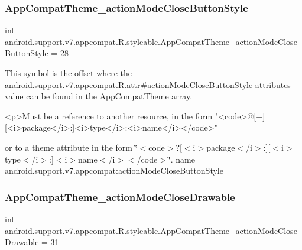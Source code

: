 \subsubsection{\texorpdfstring{App\+Compat\+Theme\+\_\+action\+Mode\+Close\+Button\+Style}{AppCompatTheme\_actionModeCloseButtonStyle}}
{\footnotesize\ttfamily int android.\+support.\+v7.\+appcompat.\+R.\+styleable.\+App\+Compat\+Theme\+\_\+action\+Mode\+Close\+Button\+Style = 28\hspace{0.3cm}{\ttfamily [static]}}

This symbol is the offset where the \hyperlink{classandroid_1_1support_1_1v7_1_1appcompat_1_1R_1_1attr_a67dbe021038d6f18acd2b888552074ac}{android.\+support.\+v7.\+appcompat.\+R.\+attr\#action\+Mode\+Close\+Button\+Style} attribute\textquotesingle{}s value can be found in the \hyperlink{classandroid_1_1support_1_1v7_1_1appcompat_1_1R_1_1styleable_a5c42f89e8a410c323be34208d75c430b}{App\+Compat\+Theme} array.

\begin{DoxyVerb}      <p>Must be a reference to another resource, in the form "<code>@[+][<i>package</i>:]<i>type</i>:<i>name</i></code>"
\end{DoxyVerb}
 or to a theme attribute in the form \char`\"{}$<$code$>$?\mbox{[}$<$i$>$package$<$/i$>$\+:\mbox{]}\mbox{[}$<$i$>$type$<$/i$>$\+:\mbox{]}$<$i$>$name$<$/i$>$$<$/code$>$\char`\"{}.  name android.\+support.\+v7.\+appcompat\+:action\+Mode\+Close\+Button\+Style \mbox{\label{classandroid_1_1support_1_1v7_1_1appcompat_1_1R_1_1styleable_ae9cbb0f39b930724e55c613214e2ed19}} 
\subsubsection{\texorpdfstring{App\+Compat\+Theme\+\_\+action\+Mode\+Close\+Drawable}{AppCompatTheme\_actionModeCloseDrawable}}
{\footnotesize\ttfamily int android.\+support.\+v7.\+appcompat.\+R.\+styleable.\+App\+Compat\+Theme\+\_\+action\+Mode\+Close\+Drawable = 31\hspace{0.3cm}{\ttfamily [static]}}

